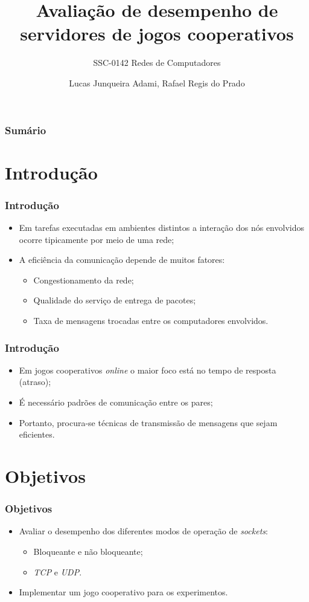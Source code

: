 \documentclass{beamer}
\title{Avaliação de desempenho de servidores de jogos cooperativos}
\subtitle{SSC-0142 Redes de Computadores}
\author{Lucas Junqueira Adami\inst{1}, Rafael Regis do Prado\inst{1}}
\institute
{
	\inst{1}
	Instituto de Ciências Matemáticas e de Computação -- Universidade de São Paulo\\
  	São Carlos, SP
}
\begin{document}
\begin{frame}[plain]
	\titlepage
\end{frame}

\begin{frame}
    \frametitle{Sumário}
    \tableofcontents
\end{frame}
\section{Introdução}

\begin{frame} \frametitle{Introdução}
\begin{itemize}
	\item \justifying Em tarefas executadas em ambientes distintos a interação dos nós envolvidos ocorre tipicamente por meio de uma rede;
	\item A eficiência da comunicação depende de muitos fatores:
	\begin{itemize}
		\item Congestionamento da rede;
		\item Qualidade do serviço de entrega de pacotes;
		\item Taxa de mensagens trocadas entre os computadores envolvidos.
	\end{itemize}
\end{itemize}
\end{frame}

\begin{frame} \frametitle{Introdução}
\begin{itemize}
	\item \justifying Em jogos cooperativos \textit{online} o maior foco está no tempo de resposta (atraso);
	\item É necessário padrões de comunicação entre os pares;
	\item \justifying Portanto, procura-se técnicas de transmissão de mensagens que sejam eficientes.
\end{itemize}
\end{frame}

\section{Objetivos}

\begin{frame} \frametitle{Objetivos}
\begin{itemize}
	\item \justifying Avaliar o desempenho dos diferentes modos de operação de \emph{sockets}:
	\begin{itemize}
		\item Bloqueante e não bloqueante;
		\item \emph{TCP} e \emph{UDP}.
	\end{itemize}
	\item \justifying Implementar um jogo cooperativo para os experimentos.
\end{itemize}	
\end{frame}
\end{document}
